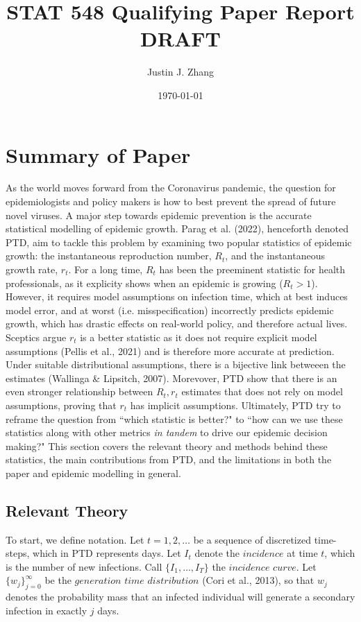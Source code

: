 \documentclass[12pt]{article}
\title{STAT 548 Qualifying Paper Report DRAFT} %
\author{Justin J. Zhang} %
\date{\today} %
\begin{document}
\maketitle

  \section{Summary of Paper}
    As the world moves forward from the Coronavirus pandemic, the question for epidemiologists and policy makers is how to 
    best prevent the spread of future novel viruses. A major step towards epidemic prevention is the accurate statistical 
    modelling of epidemic growth. Parag et al. (2022), henceforth denoted PTD, aim to tackle this problem by examining 
    two popular statistics of epidemic growth: the instantaneous reproduction number, $R_t$, 
    and the instantaneous growth rate, $r_t$. For a long time, $R_t$ has been the preeminent statistic for health professionals,
    as it explicity shows when an epidemic is growing ($R_t > 1$). However, it requires model assumptions on infection time, which
    at best induces model error, and at worst (i.e. misspecification) incorrectly predicts epidemic growth, which has drastic effects
    on real-world policy, and therefore actual lives. Sceptics argue $r_t$ is a better statistic as it does not require explicit
    model assumptions (Pellis et al., 2021) and is therefore more accurate at prediction. Under suitable distributional assumptions, 
    there is a bijective link betweeen the estimates (Wallinga \& Lipsitch, 2007). Morevover, PTD show that there is an even stronger relationship 
    between $R_t, r_t$ estimates that does not rely on model assumptions, proving that $r_t$ has implicit assumptions. 
    Ultimately, PTD try to reframe the question from ``which statistic is better?" to ``how can we use these statistics
    along with other metrics \textit{in tandem} to drive our epidemic decision making?" 
    This section covers the relevant theory and methods behind these statistics, the main contributions from PTD, 
    and the limitations in both the paper and epidemic modelling in general.

    \subsection{Relevant Theory}
      To start, we define notation. Let $t= 1,2,\dots$ be a sequence of discretized time-steps, which in PTD
      represents days. Let $I_t$ denote the $\textit{incidence}$ at time $t$, which is the number of new infections.
      Call $\{I_1,\dots,I_T\}$ the $\textit {incidence curve}$. 
      Let $\{w_j\}_{j=0}^\infty$ be the $\textit{generation time distribution}$ (Cori et al., 2013), so that $w_j$ denotes 
      the probability mass that an infected individual will generate a secondary infection in exactly $j$ days. \\
    
\end{document}
